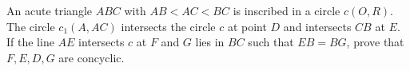 An acute triangle $ABC$ with $AB<AC<BC$ is inscribed in a circle $c(O,R)$. The circle $c_1(A,AC)$ intersects the circle $c$ at point $D$ and intersects $CB$ at $E$. If the line $AE$ intersects $c$ at $F$ and $G$ lies in $BC$ such that $EB=BG$, prove that $F,E,D,G$ are concyclic.